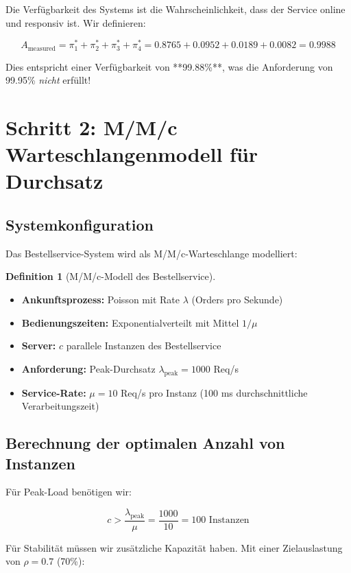 \documentclass[a4paper,11pt]{article}
\theoremstyle{definition}
\newtheorem{definition}{Definition}
\begin{document}
Die Verfügbarkeit des Systems ist die Wahrscheinlichkeit, dass der Service online und 
responsiv ist. Wir definieren:

\[
A_{\text{measured}} = \pi_1^* + \pi_2^* + \pi_3^* + \pi_4^* = 0.8765 + 0.0952 + 0.0189 + 0.0082 
= 0.9988
\]

Dies entspricht einer Verfügbarkeit von **99.88\%**, was die Anforderung von 99.95\% 
\emph{nicht} erfüllt!

\section{Schritt 2: M/M/c Warteschlangenmodell für Durchsatz}

\subsection{Systemkonfiguration}

Das Bestellservice-System wird als M/M/c-Warteschlange modelliert:

\begin{definition}[M/M/c-Modell des Bestellservice]
    \label{def:order_queue}
    
    \begin{itemize}
        \item \textbf{Ankunftsprozess:} Poisson mit Rate $\lambda$ (Orders pro Sekunde)
        \item \textbf{Bedienungszeiten:} Exponentialverteilt mit Mittel $1/\mu$
        \item \textbf{Server:} $c$ parallele Instanzen des Bestellservice
        \item \textbf{Anforderung:} Peak-Durchsatz $\lambda_{\text{peak}} = 1000$ Req/s
        \item \textbf{Service-Rate:} $\mu = 10$ Req/s pro Instanz (100 ms durchschnittliche Verarbeitungszeit)
    \end{itemize}
\end{definition}

\subsection{Berechnung der optimalen Anzahl von Instanzen}

Für Peak-Load benötigen wir:

\[
c > \frac{\lambda_{\text{peak}}}{\mu} = \frac{1000}{10} = 100 \text{ Instanzen}
\]

Für Stabilität müssen wir zusätzliche Kapazität haben. Mit einer Zielauslastung von $\rho = 0.7$ 
(70\%):
\end{document}
